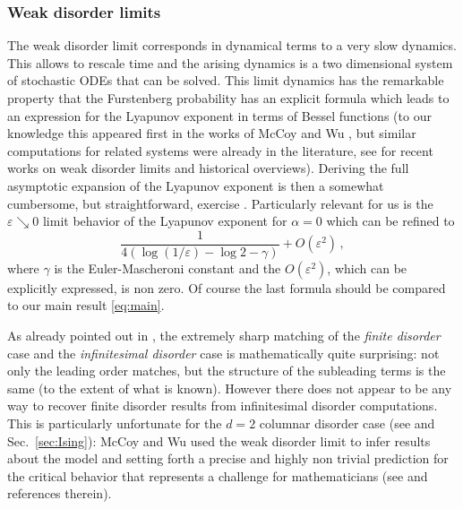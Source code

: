 \documentclass[reqno,11pt]{amsart}
\numberwithin{equation}{section}
\newcommand{\ga}{\alpha}
\newcommand{\gep}{\varepsilon}       %
\begin{document}
\subsubsection{Weak disorder limits}
The weak disorder limit  corresponds in dynamical terms to a very slow dynamics. This allows to rescale time and the arising dynamics is a two dimensional system of stochastic ODEs that can be  solved. This limit dynamics has the remarkable property that the Furstenberg probability has an explicit formula which leads to  an expression for the Lyapunov exponent  in terms of Bessel functions (to our knowledge this appeared first in the works of McCoy and Wu \cite{cf:MW}, but similar computations for related systems were already in the literature, 
see\cite{cf:CGG,cf:CLTT,cf:CPV,cf:Luck,cf:Sadel} for recent works on weak disorder limits and historical overviews). Deriving the full asymptotic expansion of the Lyapunov exponent is then a somewhat cumbersome, but straightforward, exercise \cite[Prop.~1.3]{cf:CGG}. Particularly relevant for us is the $\gep\searrow 0$ limit behavior of the Lyapunov exponent for $\ga=0$  \cite[(1.11)]{cf:CGG} which can be refined to \cite[end of Sec.~4]{cf:CGG} 
\begin{equation}
\label{eq:wd}
  \frac {1}{ 4\left(\log (1/ \gep)  - \log 2 - \gamma\right)} + O\left( \gep^2 \right)\,,
\end{equation}
where $\gamma$ is the Euler-Mascheroni constant and the $O(\gep^2)$, which can be explicitly expressed, is non zero.  
Of course the last formula should be compared to our main result \eqref{eq:main}.

As already pointed out in \cite{cf:CGG}, the extremely sharp matching of the \emph{finite disorder} case and the \emph{infinitesimal disorder} case is mathematically quite surprising: not only the leading order matches, but the structure of the subleading terms is the same (to the extent of what is known). However there does not appear to be any way  to recover finite disorder results from infinitesimal disorder computations. This is particularly unfortunate for the $d=2$ columnar disorder case  (see  \cite{cf:MW,cf:MWbook,cf:SM} and Sec.~\ref{sec:Ising}): McCoy and Wu used the weak disorder limit to infer results about the model and setting forth a precise and highly non trivial prediction for the critical behavior that represents a challenge for mathematicians (see \cite[App.~A]{cf:CGG} and references therein). 
\end{document}
